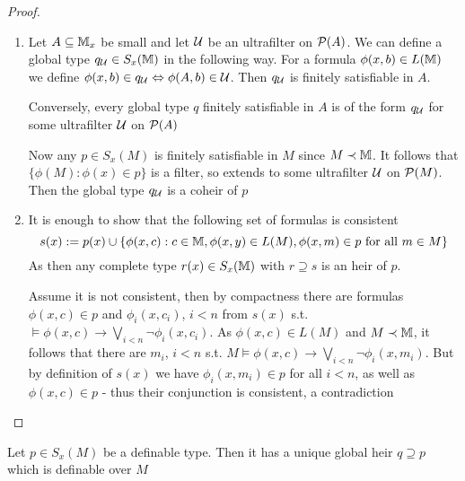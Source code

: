 \documentclass[11pt]{article}
\begin{document}
\begin{proof}
\begin{enumerate}
\item Let \(A\subseteq\mathbb{M}_x\) be small and let \(\mathcal{U}\) be an ultrafilter on \(\mathcal{P}(A)\). We can define a global
type \(q_{\mathcal{U}}\in S_x(\mathbb{M})\) in the following way. For a formula \(\phi(x,b)\in L(\mathbb{M})\) we
define \(\phi(x,b)\in q_{\mathcal{U}}\Leftrightarrow\phi(A,b)\in\mathcal{U}\). Then \(q_{\mathcal{U}}\) is finitely satisfiable in \(A\).

Conversely, every global type \(q\) finitely satisfiable in \(A\) is of the form \(q_{\mathcal{U}}\)
for some ultrafilter \(\mathcal{U}\) on \(\mathcal{P}(A)\)

Now any \(p\in S_x(M)\) is finitely satisfiable in \(M\) since \(M\prec\mathbb{M}\). It follows
that \(\{\phi(M):\phi(x)\in p\}\) is a filter, so extends to some ultrafilter \(\mathcal{U}\) on \(\mathcal{P}(M)\). Then
the global type \(q_{\mathcal{U}}\) is a coheir of \(p\)

\item It is enough to show that the following set of formulas is consistent
\begin{equation*}
s(x):=p(x)\cup\{\phi(x,c):c\in\mathbb{M},\phi(x,y)\in L(M),\phi(x,m)\in p\text{ for all }m\in M\}
\end{equation*}
As then any complete type \(r(x)\in S_x(\mathbb{M})\) with \(r\supseteq s\) is an heir of \(p\).

Assume it is not consistent, then by compactness there are formulas \(\phi(x,c)\in p\)
and \(\phi_i(x,c_i)\), \(i<n\) from \(s(x)\) s.t. \(\vDash\phi(x,c)\to\bigvee_{i<n}\neg\phi_i(x,c_i)\).
As \(\phi(x,c)\in L(M)\) and \(M\prec\mathbb{M}\), it follows that there are \(m_i\), \(i<n\)
s.t. \(M\vDash\phi(x,c)\to\bigvee_{i<n}\neg\phi_i(x,m_i)\). But by definition of \(s(x)\) we have \(\phi_i(x,m_i)\in p\) for
all \(i<n\), as well as \(\phi(x,c)\in p\) - thus their conjunction is consistent, a contradiction
\end{enumerate}
\end{proof}

\begin{proposition}[]
\label{C3.3.8}
Let \(p\in S_x(M)\) be a definable type. Then it has a unique global heir \(q\supseteq p\) which is
definable over \(M\)
\end{proposition}
\end{document}
